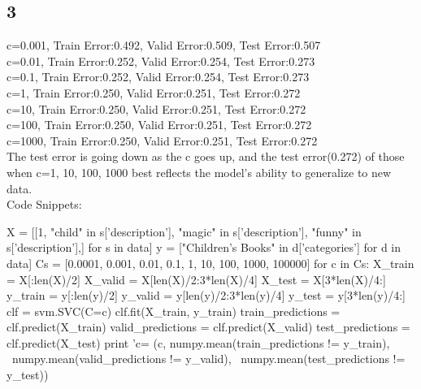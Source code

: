 \documentclass [11pt, a4paper, oneside] {article}
\begin{document}
\subsection *{3}
c=0.001, Train Error:0.492, Valid Error:0.509, Test Error:0.507\\
c=0.01, Train Error:0.252, Valid Error:0.254, Test Error:0.273\\
c=0.1, Train Error:0.252, Valid Error:0.254, Test Error:0.273\\
c=1, Train Error:0.250, Valid Error:0.251, Test Error:0.272\\
c=10, Train Error:0.250, Valid Error:0.251, Test Error:0.272\\
c=100, Train Error:0.250, Valid Error:0.251, Test Error:0.272\\
c=1000, Train Error:0.250, Valid Error:0.251, Test Error:0.272\\
The test error is going down as the c goes up, and the test error(0.272) of those when c=1, 10, 100, 1000 best reflects the model's ability to generalize to new data.\\
Code Snippets:
\begin {python}
X = [[1, "child" in s['description'],
         "magic" in s['description'],
         "funny" in s['description'],] for s in data]
y = ["Children's Books" in d['categories'] for d in data]
Cs = [0.0001, 0.001, 0.01, 0.1, 1, 10, 100, 1000, 100000]
for c in Cs:
    X_train = X[:len(X)/2]
    X_valid = X[len(X)/2:3*len(X)/4]
    X_test = X[3*len(X)/4:]
    y_train = y[:len(y)/2]
    y_valid = y[len(y)/2:3*len(y)/4]
    y_test = y[3*len(y)/4:]
    clf = svm.SVC(C=c)
    clf.fit(X_train, y_train)
    train_predictions = clf.predict(X_train)
    valid_predictions = clf.predict(X_valid)
    test_predictions = clf.predict(X_test)
    print 'c=%
    (c, numpy.mean(train_predictions != y_train), \
     numpy.mean(valid_predictions != y_valid), \
     numpy.mean(test_predictions != y_test))
\end{python}
\end{document}
